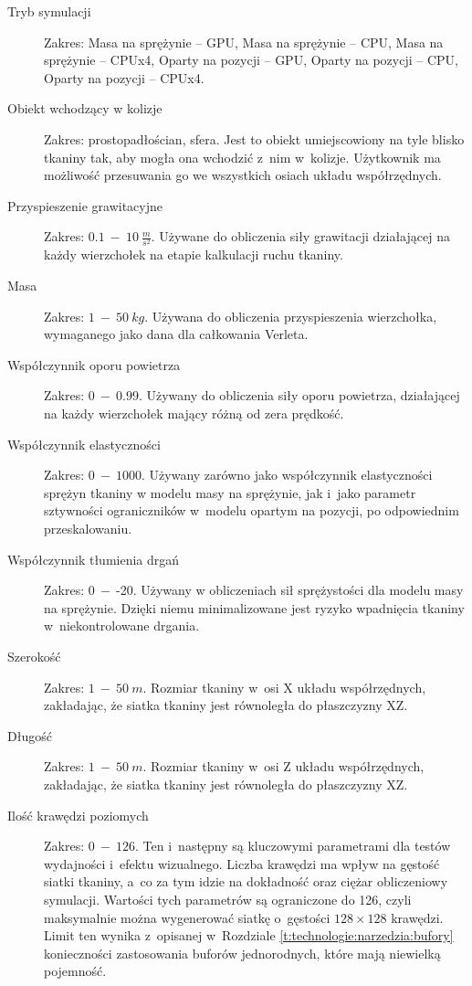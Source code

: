 		\begin{description}
			
			\item[Tryb symulacji] Zakres: Masa na sprężynie -- GPU, Masa na sprężynie -- CPU, Masa na sprężynie -- CPUx4, Oparty na pozycji -- GPU, Oparty na pozycji -- CPU, Oparty na pozycji -- CPUx4.
			
			\item[Obiekt wchodzący w kolizje] Zakres: prostopadłościan, sfera. Jest to obiekt umiejscowiony na tyle blisko tkaniny tak, aby mogła ona wchodzić z~nim w~kolizje. Użytkownik ma możliwość przesuwania go we wszystkich osiach układu współrzędnych.
			
			\item[Przyspieszenie grawitacyjne] Zakres: \(0.1\ -\ 10\ \frac{m}{s^{2}} \). Używane do obliczenia siły grawitacji działającej na każdy wierzchołek na etapie kalkulacji ruchu tkaniny.
			
			\item[Masa] Zakres: \(1\ -\ 50\ kg\). Używana do obliczenia przyspieszenia wierzchołka, wymaganego jako dana dla całkowania Verleta.
			
			\item[Współczynnik oporu powietrza] Zakres: \(0\ -\ 0.99\). Używany do obliczenia siły oporu powietrza, działającej na każdy wierzchołek mający różną od zera prędkość.
			
			\item[Współczynnik elastyczności] Zakres: \(0\ -\ 1000\). Używany zarówno jako współczynnik elastyczności sprężyn tkaniny w modelu masy na sprężynie, jak i~jako parametr sztywności ograniczników w~modelu opartym na pozycji, po odpowiednim przeskalowaniu.
			
			\item[Współczynnik tłumienia drgań] Zakres: \(0\ -\ \)-20. Używany w obliczeniach sił sprężystości dla modelu masy na sprężynie. Dzięki niemu minimalizowane jest ryzyko wpadnięcia tkaniny w~niekontrolowane drgania.
			
			\item[Szerokość] Zakres: \(1\ -\ 50\ m\). Rozmiar tkaniny w~osi X układu współrzędnych, zakładając, że siatka tkaniny jest równoległa do płaszczyzny XZ.
			
			\item[Długość]Zakres: \(1\ -\ 50\ m\). Rozmiar tkaniny w~osi Z układu współrzędnych, zakładając, że siatka tkaniny jest równoległa do płaszczyzny XZ.
			
			\item[Ilość krawędzi poziomych] Zakres: \(0\ -\ 126\). Ten i~następny są kluczowymi parametrami dla testów wydajności i~efektu wizualnego. Liczba krawędzi ma wpływ na gęstość siatki tkaniny, a~co za tym idzie na dokładność oraz ciężar obliczeniowy symulacji. Wartości tych parametrów są ograniczone do 126, czyli maksymalnie można wygenerować siatkę o~gęstości \( 128 \times 128 \) krawędzi. Limit ten wynika z~opisanej w~Rozdziale \ref{t:technologie:narzedzia:bufory} konieczności zastosowania buforów jednorodnych, które mają niewielką pojemność.
			

\end{description}
